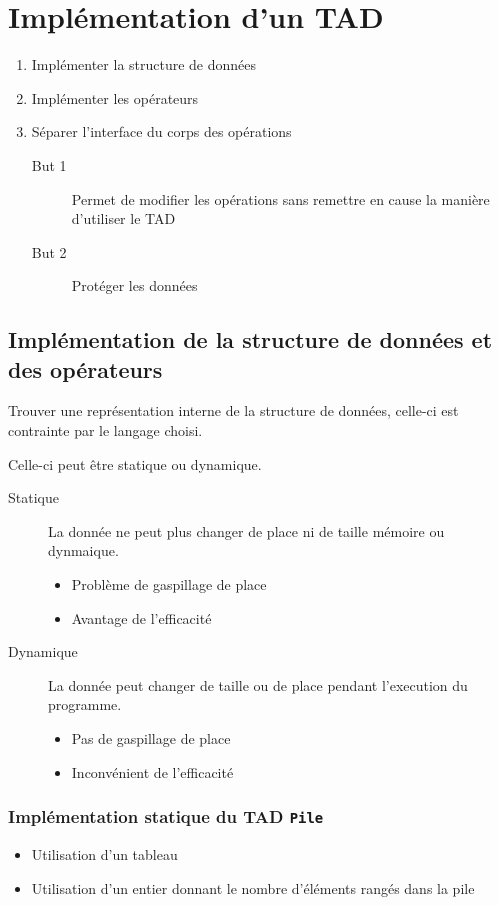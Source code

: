 \section{Implémentation d'un TAD}
\begin{enumerate}
	\item Implémenter la structure de données
	\item Implémenter les opérateurs
	\item Séparer l'interface du corps des opérations
		\begin{description}
			\item[But 1] Permet de modifier les opérations sans remettre en cause la manière d'utiliser le TAD
			\item[But 2] Protéger les données
		\end{description}
\end{enumerate}

\subsection{Implémentation de la structure de données et des opérateurs}
Trouver une représentation interne de la structure de données, celle-ci est contrainte par le langage choisi.

Celle-ci peut être statique ou dynamique. 
\begin{description}
	\item[Statique] La donnée ne peut plus changer de place ni de taille mémoire ou dynmaique.
		\begin{itemize}
			\item Problème de gaspillage de place
			\item Avantage de l'efficacité
		\end{itemize}
	\item[Dynamique] La donnée peut changer de taille ou de place pendant l'execution du programme.
		\begin{itemize}
			\item Pas de gaspillage de place
			\item Inconvénient de l'efficacité
		\end{itemize}
\end{description}

\subsubsection{Implémentation statique du TAD \texttt{Pile}}
\begin{itemize}
	\item Utilisation d'un tableau
	\item Utilisation d'un entier donnant le nombre d'éléments rangés dans la pile
\end{itemize}


